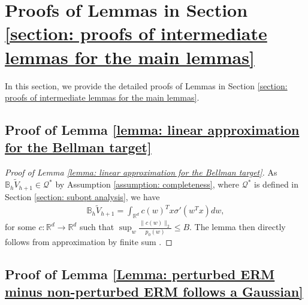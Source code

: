 \documentclass{article} \usepackage{iclr2023/iclr2023_conference,times}
\begin{document}
 \section{Proofs of Lemmas in Section \ref{section: proofs of intermediate lemmas for the main lemmas}}
\label{section: proof of intermediate lemmas of intermediate lemmas}
In this section, we provide the detailed proofs of Lemmas in Section \ref{section: proofs of intermediate lemmas for the main lemmas}. 

\subsection{Proof of Lemma \ref{lemma: linear approximation for the Bellman target}}
\begin{proof}[Proof of Lemma \ref{lemma: linear approximation for the Bellman target}]
As $\mathbb{B}_h \tilde{V}_{h+1} \in \mathcal{Q}^*$ by Assumption \ref{assumption: completeness}, where $\mathcal{Q}^*$ is defined in Section \ref{section: subopt analysis},
we have 
\begin{align*}
    \mathbb{B}_h \tilde{V}_{h+1} =  \int_{\mathbb{R}^d} c(w)^T x \sigma'(w^T x) d w,
\end{align*}
for some $c: \mathbb{R}^d \rightarrow \mathbb{R}^d$ such that $\sup_{w} \frac{\| c(w) \|_2}{p_0(w)} \leq B$. The lemma then directly follows from approximation by finite sum \citep{gao2019convergence}. 
\end{proof}

\subsection{Proof of Lemma \ref{Lemma: perturbed ERM minus non-perturbed ERM follows a Gaussian}}
\end{document}
